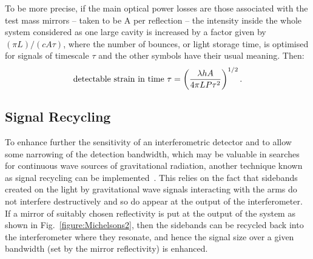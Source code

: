 \documentclass{article}
\begin{document}
To be more precise, if the main optical power losses are those associated with
the test mass mirrors -- taken to be A per reflection -- the intensity inside
the whole system considered as one large cavity is increased by a factor given
by $(\pi L)/(c A \tau)$, where the number of bounces, or light storage time, is
optimised for signals of timescale $\tau$ and the other symbols have their usual
meaning. Then:
%
\begin{equation}
  {\rm detectable\ strain\ in\ time\ } \tau = \left( \frac{\lambda h
  A}{4 \pi L P \tau^2} \right)^{1/2}.
  \label{equation:shotpower}
\end{equation}


\subsection{Signal Recycling}
\label{subsection:sigrec}

To enhance further the sensitivity of an interferometric detector and to allow
some narrowing of the detection bandwidth, which may be valuable in searches for
continuous wave sources of gravitational radiation, another technique known as
signal recycling can be implemented~\cite{Meers, Strain, Heinzel}. This relies
on the fact that sidebands created on the light by gravitational wave signals
interacting with the arms do not interfere destructively and so do appear at the
output of the interferometer. If a mirror of suitably chosen reflectivity is put
at the output of the system as shown in Fig.~\ref{figure:Michelsons2}, then the
sidebands can be recycled back into the interferometer where they resonate, and
hence the signal size over a given bandwidth (set by the mirror reflectivity) is
enhanced.
\end{document}
